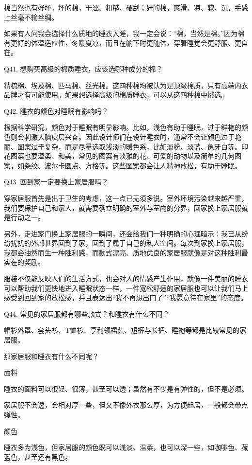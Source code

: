 \documentclass[12pt,UTF8]{ctexbook}
\begin{document}
棉当然也有好坏。坏的棉，干涩、粗糙、硬刮；好的棉，爽滑、凉、软、沉，手感上丝毫不输丝绸。

如果有人问我会选择什么质地的睡衣入睡，我一定会说：“棉，当然是棉。”因为棉有更好的体温适应性，冬暖夏凉，而且在躺下时更随体，穿着睡觉会更舒服、更自在。


Q41. 想购买高级的棉质睡衣，应该选哪种成分的棉？


精梳棉、埃及棉、匹马棉、丝光棉。这四种棉均被认为是顶级棉质，只有高端内衣品牌才有可能使用。如果想选择高级的棉质睡衣，可以从这四种棉中挑选。


Q42. 睡衣的颜色对睡眠有影响吗？


根据科学研究，颜色对于睡眠有明显影响。比如，浅色有助于睡眠，过于鲜艳的颜色则会刺激大脑皮层兴奋。因此设计师们在设计睡衣时，通常不会让颜色过于艳丽、图案过于复杂，而是尽量选取浅淡的暖色系，比如淡粉、淡蓝、象牙白等。印花图案也要温柔、和美，常见的图案有淡雅的花、可爱的动物以及简单的几何图案，如条纹、波尔卡圆点、方格等。这些图案都会让人精神放松，有助于睡眠。

Q43. 回到家一定要换上家居服吗？


穿家居服首先是出于卫生的考虑，这一点已无须多说。室外环境污染越来越严重，我们要保护自己和家人，就需要确立明确的室外与室内的分界，回家换上家居服就是行动之一。

另外，走进家门换上家居服的一瞬间，还会给我们一种明确的心理暗示：我已从纷纷扰扰的外部世界回到了家，回到了属于自己的私人空间。每次到家换上家居服，我都会油然而生一种胜利感，而款式漂亮、质地优良的家居服就像是对这种胜利最实在的奖励。

服装不仅能反映人们的生活方式，也会对人的情感产生作用，就像一件美丽的睡衣可以帮助我们更快地进入睡眠状态一样，一件宽松舒适的家居服也可以让我们马上感受到回到家的放松感，并且表达出“我不再想出门了”“我愿意待在家里”的态度。

Q44. 常见的家居服都有哪些款式？和睡衣有什么不同？


帽衫外罩、套头衫、T恤衫、亨利领裙装、短裤与长裤、睡袍等都是比较常见的家居服。

那家居服和睡衣有什么不同呢？

面料

睡衣的面料可以很轻、很薄，甚至可以透；虽然有不少是有弹性的，但不是必须。

家居服不会透，会相对厚一些，但又不像外衣那么厚，为方便起居，一般都会带点弹性。

颜色

睡衣多为浅色，但家居服的颜色既可以浅淡、温柔，也可以深一些，如咖啡色、藏蓝色，甚至还有黑色。
\end{document}
